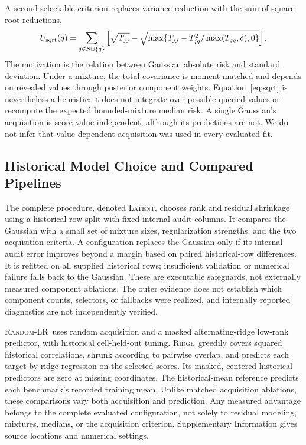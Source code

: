 \documentclass{article}
\newcommand{\latent}{\textsc{Latent}}
\newcommand{\ridge}{\textsc{Ridge}}
\newcommand{\randomlr}{\textsc{Random-LR}}
\begin{document}
A second selectable criterion replaces variance reduction with the sum of square-root reductions,
\begin{equation}
 U_{\rm sqrt}(q)=\sum_{j\notin S\cup\{q\}}
 \left[\sqrt{T_{jj}}-
 \sqrt{\max\{T_{jj}-T_{jq}^2/\max(T_{qq},\delta),0\}}\right].
 \label{eq:sqrt}
\end{equation}
The motivation is the relation between Gaussian absolute risk and standard deviation. Under a mixture, the total covariance is moment matched and depends on revealed values through posterior component weights. Equation~\ref{eq:sqrt} is nevertheless a heuristic: it does not integrate over possible queried values or recompute the expected bounded-mixture median risk. A single Gaussian's acquisition is score-value independent, although its predictions are not. We do not infer that value-dependent acquisition was used in every evaluated fit.

\subsection{Historical Model Choice and Compared Pipelines}
The complete procedure, denoted \latent, chooses rank and residual shrinkage using a historical row split with fixed internal audit columns. It compares the Gaussian with a small set of mixture sizes, regularization strengths, and the two acquisition criteria. A configuration replaces the Gaussian only if its internal audit error improves beyond a margin based on paired historical-row differences. It is refitted on all supplied historical rows; insufficient validation or numerical failure falls back to the Gaussian. These are executable safeguards, not externally measured component ablations. The outer evidence does not establish which component counts, selectors, or fallbacks were realized, and internally reported diagnostics are not independently verified.

\randomlr\ uses random acquisition and a masked alternating-ridge low-rank predictor, with historical cell-held-out tuning. \ridge\ greedily covers squared historical correlations, shrunk according to pairwise overlap, and predicts each target by ridge regression on the selected scores. Its masked, centered historical predictors are zero at missing coordinates. The historical-mean reference predicts each benchmark's recorded training mean. Unlike matched acquisition ablations, these comparisons vary both acquisition and prediction. Any measured advantage belongs to the complete evaluated configuration, not solely to residual modeling, mixtures, medians, or the acquisition criterion. Supplementary Information gives source locations and numerical settings.
\end{document}

